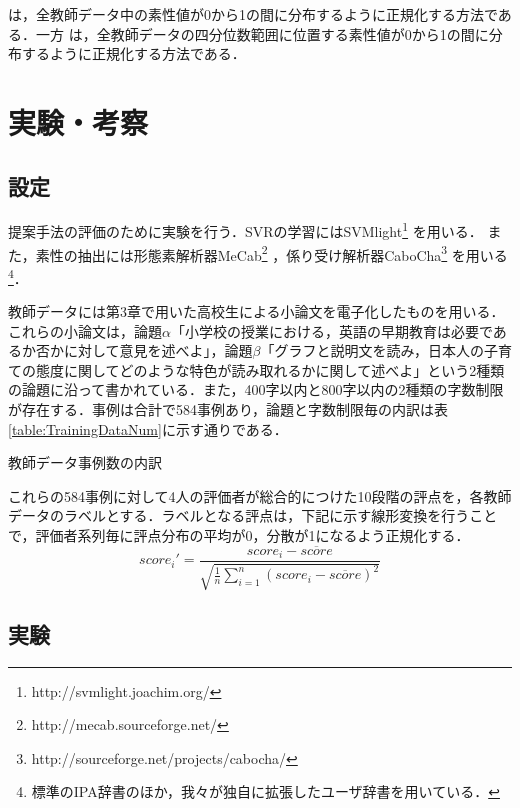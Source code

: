 \documentclass[japanese]{jnlp_1.5}
\begin{document}
は，全教師データ中の素性値が0から1の間に分布するように正規化する方法である．一方
は，全教師データの四分位数範囲に位置する素性値が0から1の間に分布するように正規化する方法である．



\section{実験・考察}

\subsection{設定}

提案手法の評価のために実験を行う．SVRの学習にはSVMlight\footnote{
	http://svmlight.joachim.org/}
を用いる．
\pagebreak
また，素性の抽出には形態素解析器MeCab\footnote{
	http://mecab.sourceforge.net/}
，係り受け解析器CaboCha\footnote{
	http://sourceforge.net/projects/cabocha/}
を用いる\footnote{
	標準のIPA辞書のほか，我々が独自に拡張したユーザ辞書\cite{FujitaFujitaTamura2011}を用いている．}．

教師データには第3章で用いた高校生による小論文を電子化したものを用いる．これらの小論文は，論題$\alpha$「小学校の授業における，英語の早期教育は必要であるか否かに対して意見を述べよ」，論題$\beta$「グラフと説明文を読み，日本人の子育ての態度に関してどのような特色が読み取れるかに関して述べよ」という2種類の論題に沿って書かれている．また，400字以内と800字以内の2種類の字数制限が存在する．事例は合計で584事例あり，論題と字数制限毎の内訳は表\ref{table:TrainingDataNum}に示す通りである．

\begin{table}[b]
\caption{教師データ事例数の内訳}
\label{table:TrainingDataNum}

\end{table}

これらの584事例に対して4人の評価者が総合的につけた10段階の評点を，各教師データのラベルとする．ラベルとなる評点は，下記に示す線形変換を行うことで，評価者系列毎に評点分布の平均が0，分散が1になるよう正規化する．
\[
score_{i}'=\frac{score_{i}-\overline{score}}{\sqrt{\frac{1}{n}\sum^{n}_{i=1}{(score_{i}-\overline{score})}^{2}}}
\]


\subsection{実験}

\noindent {}
\end{document}
